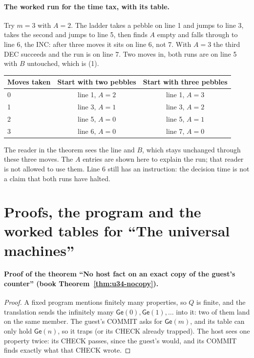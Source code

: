 \documentclass[11pt,twoside]{article}
\theoremstyle{thielethm}
\theoremstyle{thieledef}
\theoremstyle{thieledef}
\theoremstyle{thieledef}
\theoremstyle{thielethm}
\theoremstyle{thieleobs}
\theoremstyle{thielethm}
\begin{document}
\paragraph{The worked run for the time tax, with its table.}
Try $m = 3$ with $A = 2$. The ladder takes a pebble on line 1 and jumps to line 3, takes the second
and jumps to line 5, then finds $A$ empty and falls through to line 6, the INC: after three moves
it sits on line 6, not 7. With $A = 3$ the third DEC succeeds and the run is on line 7. Two
moves in, both runs are on line 5 with $B$ untouched, which is (1).

\begin{center}
\begin{tabular}{lcc}
\toprule
Moves taken & Start with two pebbles & Start with three pebbles\\
\midrule
0 & line 1, $A=2$ & line 1, $A=3$\\
1 & line 3, $A=1$ & line 3, $A=2$\\
2 & line 5, $A=0$ & line 5, $A=1$\\
3 & line 6, $A=0$ & line 7, $A=0$\\
\bottomrule
\end{tabular}

\small The reader in the theorem sees the line and $B$, which stays unchanged
through these three moves. The $A$ entries are shown here to explain the run;
that reader is not allowed to use them. Line 6 still has an instruction:
the decision time is not a claim that both runs have halted.
\end{center}


\section{Proofs, the program and the worked tables for ``The universal machines''}

\paragraph{Proof of the theorem ``No host fact on an exact copy of the guest's counter'' (book Theorem~\ref{thm:u34-nocopy}).}
\begin{proof}
A fixed program mentions finitely many properties, so $Q$ is finite, and the translation sends
the infinitely many $\mathsf{Ge}(0), \mathsf{Ge}(1), \ldots$ into it: two of them land on the
same member. The guest's COMMIT asks for $\mathsf{Ge}(m)$, and its table can only hold
$\mathsf{Ge}(n)$, so it traps (or its CHECK already trapped). The host sees one property twice:
its CHECK passes, since the guest's would, and its COMMIT finds exactly what that CHECK wrote.
\end{proof}
\end{document}
